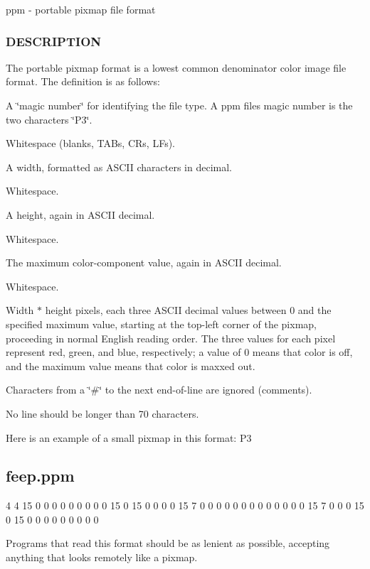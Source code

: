 ppm -\/ portable pixmap file format 

\subsubsection*{D\+E\+S\+C\+R\+I\+P\+T\+I\+ON}

The portable pixmap format is a lowest common denominator color image file format. The definition is as follows\+:


\begin{DoxyItemize}
\item A \char`\"{}magic number\char`\"{} for identifying the file type. A ppm file\textquotesingle{}s magic number is the two characters \char`\"{}\+P3\char`\"{}.
\item Whitespace (blanks, T\+A\+Bs, C\+Rs, L\+Fs).
\item A width, formatted as A\+S\+C\+II characters in decimal.
\item Whitespace.
\item A height, again in A\+S\+C\+II decimal.
\item Whitespace.
\item The maximum color-\/component value, again in A\+S\+C\+II decimal.
\item Whitespace.
\item Width $\ast$ height pixels, each three A\+S\+C\+II decimal values between 0 and the specified maximum value, starting at the top-\/left corner of the pixmap, proceeding in normal English reading order. The three values for each pixel represent red, green, and blue, respectively; a value of 0 means that color is off, and the maximum value means that color is maxxed out.
\item Characters from a \char`\"{}\#\char`\"{} to the next end-\/of-\/line are ignored (comments).
\item No line should be longer than 70 characters.
\end{DoxyItemize}

Here is an example of a small pixmap in this format\+: P3 \subsection*{feep.\+ppm}

4 4 15 0 0 0 0 0 0 0 0 0 15 0 15 0 0 0 0 15 7 0 0 0 0 0 0 0 0 0 0 0 0 0 15 7 0 0 0 15 0 15 0 0 0 0 0 0 0 0 0

Programs that read this format should be as lenient as possible, accepting anything that looks remotely like a pixmap.

